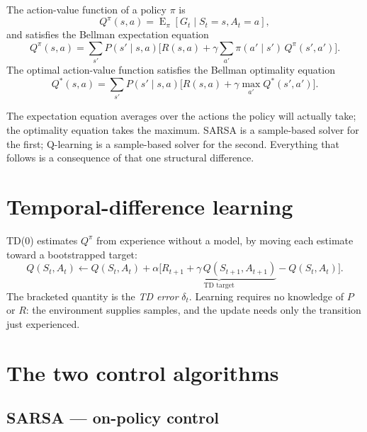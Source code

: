The action-value function of a policy $\pi$ is
\begin{equation}
Q^{\pi}(s,a) = \operatorname{E}_{\pi}\!\left[G_t \mid S_t = s, A_t = a\right],
\end{equation}
and satisfies the Bellman expectation equation
\begin{equation}
Q^{\pi}(s,a) = \sum_{s'} P(s' \mid s,a)\Big[R(s,a) + \gamma \sum_{a'} \pi(a' \mid s')\, Q^{\pi}(s',a')\Big].
\label{eq:bellman_exp}
\end{equation}
The optimal action-value function satisfies the Bellman optimality equation
\begin{equation}
Q^{*}(s,a) = \sum_{s'} P(s' \mid s,a)\Big[R(s,a) + \gamma \max_{a'} Q^{*}(s',a')\Big].
\label{eq:bellman_opt}
\end{equation}

 The expectation equation averages over
the actions the policy will actually take; the optimality equation takes the maximum. SARSA is a
sample-based solver for the first; Q-learning is a sample-based solver for the second. Everything
that follows is a consequence of that one structural difference.

\section{Temporal-difference learning}

TD(0) estimates $Q^{\pi}$ from experience without a model, by moving each estimate toward a
bootstrapped target:
\begin{equation}
Q(S_t,A_t) \leftarrow Q(S_t,A_t) + \alpha\big[\underbrace{R_{t+1} + \gamma\, Q(S_{t+1},A_{t+1})}_{\text{TD target}} - Q(S_t,A_t)\big].
\end{equation}
The bracketed quantity is the \emph{TD error} $\delta_t$. Learning requires no knowledge of $P$ or
$R$: the environment supplies samples, and the update needs only the transition just experienced.

\section{The two control algorithms}

\subsection{SARSA --- on-policy control}

